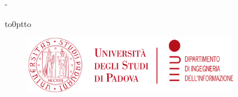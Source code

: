 \begin{titlingpage}
	\thispagestyle{empty}


	\calccentering\unitlength %

	\begin{adjustwidth}{\unitlength}{-\unitlength}
		\begin{center}
			\vbox to0pt{\vbox to\vss}
			\begin{figure}
				\centering
				\includegraphics[height=2.45cm]{themes/unipd-dei/static/unipd-dei.png}%
			\end{figure}


\end{center}
\end{adjustwidth}
\end{titlingpage}
